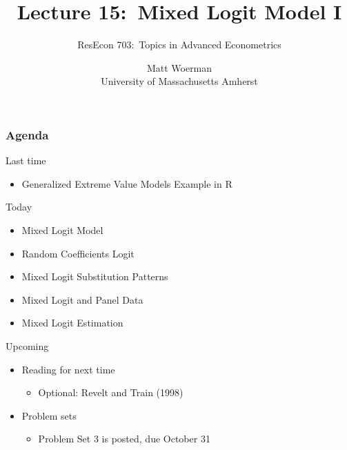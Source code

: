 \documentclass{beamer}
\title[Lecture 15:\ Mixed Logit Model I]{Lecture 15:\ Mixed Logit Model I}
\author[ResEcon 703:\ Advanced Econometrics]{ResEcon 703:\ Topics in Advanced Econometrics}
\date{Matt Woerman\\University of Massachusetts Amherst}
\begin{document}
{ 
\begin{frame}[noframenumbering]
    \titlepage
\end{frame}
}

\begin{frame}\frametitle{Agenda}
    Last time
    \begin{itemize}
        \item Generalized Extreme Value Models Example in R
    \end{itemize}
    \vspace{2ex}
    Today
    \begin{itemize}
    	\item Mixed Logit Model
        \item Random Coefficients Logit
        \item Mixed Logit Substitution Patterns
        \item Mixed Logit and Panel Data
        \item Mixed Logit Estimation
    \end{itemize}
    \vspace{2ex}
    Upcoming
    \begin{itemize}
        \item Reading for next time
        \begin{itemize}
            \item Optional: Revelt and Train (1998)
        \end{itemize}
        \item Problem sets
        \begin{itemize}
            \item Problem Set 3 is posted, due October 31
        \end{itemize}
    \end{itemize}
\end{frame}
\end{document}

